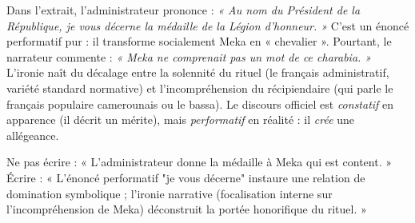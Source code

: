 \documentclass[11pt]{article}
\newcommand{\cle}[1]{{\popxbold\color{popdark}#1}}
\begin{document}
Dans l'extrait, l'administrateur prononce : \emph{« Au nom du Président de la République, je vous décerne la médaille de la Légion d'honneur. »} C'est un \cle{énoncé performatif} pur : il transforme socialement Meka en « chevalier ». Pourtant, le narrateur commente : \emph{« Meka ne comprenait pas un mot de ce charabia. »} L'\cle{ironie} naît du décalage entre la solennité du rituel (le français administratif, \cle{variété standard} normative) et l'incompréhension du récipiendaire (qui parle le \cle{français populaire camerounais} ou le \cle{bassa}). Le discours officiel est \emph{constatif} en apparence (il décrit un mérite), mais \emph{performatif} en réalité : il \emph{crée} une allégeance.

\begin{attention}
Ne pas écrire : « L'administrateur donne la médaille à Meka qui est content. »
Écrire : « L'énoncé performatif "je vous décerne" instaure une relation de domination symbolique ; l'ironie narrative (focalisation interne sur l'incompréhension de Meka) déconstruit la portée honorifique du rituel. »
\end{attention}
\end{document}
